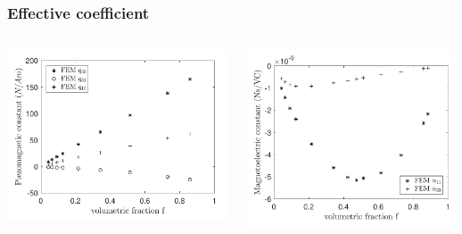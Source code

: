 \documentclass[compress]{beamer}
\begin{document}
\begin{frame}\frametitle{Effective coefficient}
\begin{columns}[totalwidth=\textwidth]
	\begin{column}{.49\textwidth}
	\centering
	\includegraphics[width=0.99\textwidth]{Graphic/04_cubematqu.pdf}
	\end{column}
	\begin{column}{.49\textwidth}
	\centering	
	\includegraphics[width=0.99\textwidth]{Graphic/04_cubematalpha.pdf}
	\end{column}
\end{columns}
\end{frame}
\end{document}
